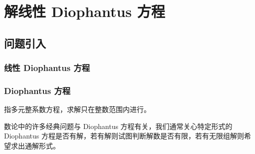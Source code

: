 \documentclass{../pkslide}
\begin{document}

\section{解线性 Diophantus 方程}
\subsection{问题引入}
\subsubsection{线性 Diophantus 方程}


\begin{frame}
  \frametitle{Diophantus 方程}
  \begin{definition}
    指多元整系数方程，求解只在整数范围内进行。
  \end{definition}
  
  数论中的许多经典问题与 Diophantus 方程有关，我们通常关心特定形式的 Diophantus 方程是否有解，若有解则试图判断解数是否有限，若有无限组解则希望求出通解形式。
\end{frame}
\end{document}
